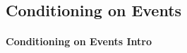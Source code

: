 \documentclass[6008notes.tex]{subfiles}
\begin{document}
\graphicspath{ {images/conditioning/} }

\subsection{Conditioning on Events}

\paragraph{Conditioning on Events Intro}
\end{document}
